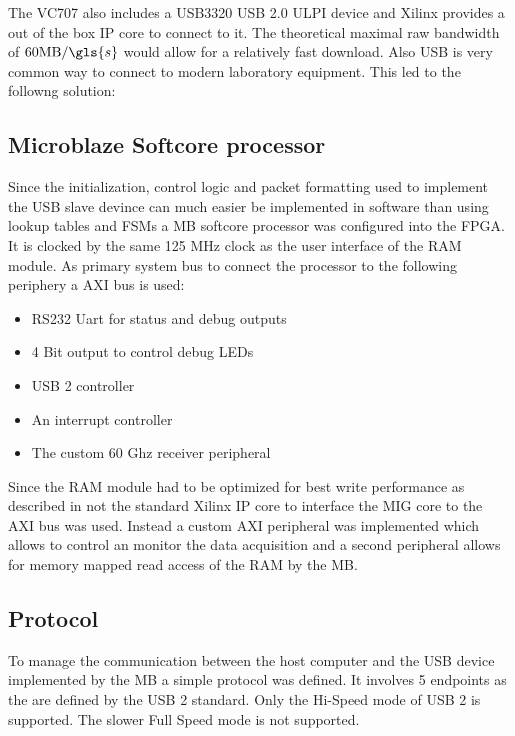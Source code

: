 The VC707 also includes a USB3320 USB 2.0 ULPI device and Xilinx provides
a out of the box \gls{IP} core to connect to it. The theoretical maximal
raw bandwidth of $60 \text{MB}/\gls{s}$ would allow for a relatively fast
download. Also \gls{USB} is very common way to connect to modern laboratory
equipment. This led to the followng solution:

\subsection{Microblaze Softcore processor}
Since the initialization, control logic and packet formatting
used to implement the \gls{USB} slave devince 
can much easier be implemented in software than using lookup tables and
\glspl{FSM} a \gls{MB} softcore processor was configured into the \gls{FPGA}.
It is clocked by the same 125 MHz clock as the user interface of the \gls{RAM}
module. As primary system bus to connect the processor to the following periphery
a \gls{AXI} bus is used:
\begin{itemize}
\item RS232 Uart for status and debug outputs
\item 4 Bit output to control debug \glspl{LED}
\item USB 2 controller
\item An interrupt controller
\item The custom 60 Ghz receiver peripheral
\end{itemize}

Since the \gls{RAM} module had to be optimized for best write performance
as described in  not the standard Xilinx \gls{IP}
core to interface the \gls{MIG} core to the \gls{AXI} bus was used.
Instead a custom \gls{AXI} peripheral was implemented which allows to
control an monitor the data acquisition and a second peripheral allows
for memory mapped read access of the \gls{RAM} by the \gls{MB}.

\subsection{Protocol}
To manage the communication between the host computer and the \gls{USB} device
implemented by the \gls{MB} a simple protocol was defined.
It involves 5 endpoints as the are defined by the \gls{USB} 2 standard.
Only the Hi-Speed mode of \gls{USB} 2 is supported. The slower Full Speed mode 
is not supported. \\

